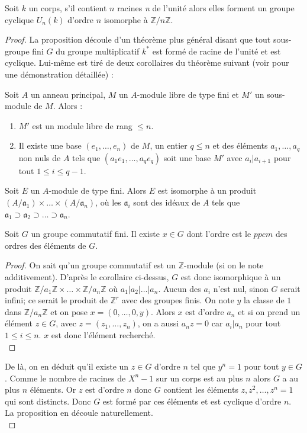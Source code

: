 \documentclass[a4paper]{article} %
\numberwithin{equation}{section}
\newcommand\nroot[1]{\textit{#1}\up{\textit{ième}}}
\newcommand\zmodn[1]{\mathbb{Z}/#1\mathbb{Z}}
\begin{document}
\begin{prop}
\label{proprootcycl}
Soit $k$ un corps, s'il contient $n$ racines \nroot{n} de l'unité alors elles forment un groupe cyclique $U_n(k)$ d'ordre $n$ isomorphe à $\zmodn{n}$.
\end{prop}
\begin{proof}
La proposition découle d'un théorème plus général disant que tout sous-groupe fini $G$ du groupe multiplicatif $k^*$ est formé de racine de l'unité et est cyclique. Lui-même est tiré de deux corollaires du théorème suivant (voir \cite[p.~26-27]{Sam} pour une démonstration détaillée) :

\begin{thm}
Soit $A$ un anneau principal, $M$ un $A$-module libre de type fini et $M'$ un sous-module de $M$. Alors :
\begin{enumerate}[1)]
\item $M'$ est un module libre de rang $\leq n$.
\item Il existe une base $(e_1,\dots,e_n)$ de $M$, un entier $q\leq n$ et des éléments $a_1,\dots,a_q$ non nuls de $A$ tels que $(a_1e_1,\dots,a_qe_q)$ soit une base $M'$ avec $a_i|a_{i+1}$ pour tout $1\leq i\leq q-1$.
\end{enumerate}
\end{thm}

\begin{cor}
Soit $E$ un $A$-module de type fini. Alors $E$ est isomorphe à un produit $(A/\mathfrak{a}_1)\times\dots\times(A/\mathfrak{a}_n)$, où les $\mathfrak{a}_i$ sont des idéaux de $A$ tels que $\mathfrak{a}_1\supset\mathfrak{a}_2\supset\dots\supset\mathfrak{a}_n$.
\end{cor}

\begin{cor}
Soit $G$ un groupe commutatif fini. Il existe $x\in G$ dont l'ordre est le $ppcm$ des ordres des éléments de $G$.
\end{cor}
\begin{proof}
On sait qu'un groupe commutatif est un $\mathbb{Z}$-module (si on le note additivement). D'après le corollaire ci-dessus, $G$ est donc isomorphique à un produit $\zmodn{a_1}\times\dots\times\zmodn{a_n}$ où $a_1|a_2|\dots|a_n$. Aucun des $a_i$ n'est nul, sinon $G$ serait infini; ce serait le produit de $\mathbb{Z}^r$ avec des groupes finis. On note $y$ la classe de $1$ dans $\zmodn{a_n}$ et on pose $x = (0,\dots,0,y)$. Alors $x$ est d'ordre $a_n$ et si on prend un élément $z\in G$, avec $z = (z_1,\dots,z_n)$, on a aussi $a_nz = 0$ car $a_i|a_n$ pour tout $1\leq i \leq n$. $x$ est donc l'élément recherché.\\
\end{proof}

De là, on en déduit qu'il existe un $z\in G$ d'ordre $n$ tel que $y^n = 1$ pour tout $y\in G$. Comme le nombre de racines de $X^n - 1$ sur un corps est au plus $n$ alors $G$ a au plus $n$ éléments. Or $z$ est d'ordre $n$ donc $G$ contient les éléments $z, z^2,\dots,z^n = 1$ qui sont distincts. Donc $G$ est formé par ces éléments et est cyclique d'ordre $n$. La proposition en découle naturellement.\\
\end{proof}
\end{document}
